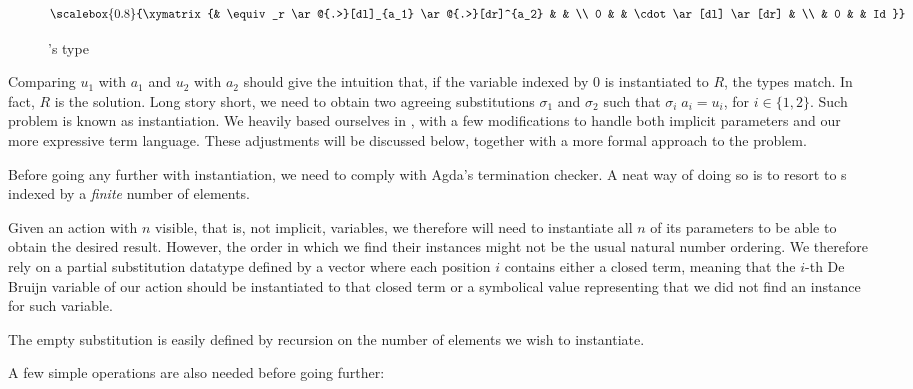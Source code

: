 \begin{wrapfigure}{r}{0.50\textwidth}
\begin{displaymath}
\scalebox{0.8}{%
\xymatrix{%
 & \equiv_r \ar@{.>}[dl]_{a_1} \ar@{.>}[dr]^{a_2} & & \\
0 & & \cdot \ar[dl] \ar[dr] & \\
& 0 & & Id
}}
\end{displaymath}
\caption{'s type}
\label{fig:debruijn_idr}
\end{wrapfigure}

Comparing $u_1$ with $a_1$ and $u_2$ with $a_2$ should give the intuition that, if the
variable indexed by $0$ is instantiated to $R$, the types match. In fact, $R$ is the solution.
Long story short, we need to obtain two agreeing substitutions $\sigma_1$ and $\sigma_2$ such
that $\sigma_i\;a_i = u_i$, for $i\in\{1 , 2\}$. Such problem is known as instantiation.
We heavily based ourselves in \cite{wouter13}, with a few modifications to handle both implicit
parameters and our more expressive term language. These adjustments will be discussed below,
together with a more formal approach to the problem.

Before going any further with instantiation, we need to comply with Agda's termination checker.
A neat way of doing so is to resort to s indexed by a \emph{finite} number of elements.


Given an action with $n$ visible, that is, not implicit, variables, we therefore will need to instantiate all $n$ of its parameters to be able to
obtain the desired result. However, the order in which we find their instances
might not be the usual natural number ordering. We therefore rely on a
partial substitution datatype defined by a vector where each position $i$ contains
either a closed term, meaning that the $i$-th De Bruijn variable of our action should be instantiated to that closed term or a symbolical value representing that we did not find an instance for such variable.


The empty substitution is easily defined by recursion on the number of elements we wish to instantiate.


A few simple operations are also needed before going further:

\\

